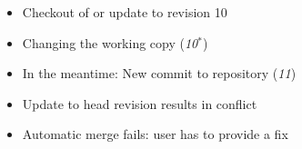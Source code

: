 \begin{frame}[fragile]
\begin{columns}[T, onlytextwidth]
\begin{column}{0.6\linewidth}
			\begin{example}{}
				\begin{itemize}
					\item<1-> Checkout of or update to revision 10
					\item<2-> Changing the working copy (\emph{10$^*$})
					\item<3-> In the meantime: New commit to repository (\emph{11})
					\item<4-> Update to head revision results in conflict
					\item<4-> Automatic merge fails: user has to provide a fix
				\end{itemize}			
			\end{example}
		\end{column}
		\begin{column}{0.5\linewidth}
		\end{column}
	\end{columns}
\end{frame}
